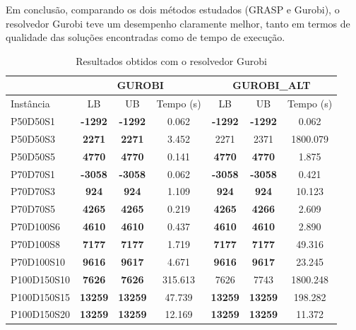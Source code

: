 \documentclass{MO824}
\begin{document}
Em conclusão, comparando os dois métodos estudados (GRASP e Gurobi), o resolvedor Gurobi teve um desempenho claramente melhor, tanto em termos de qualidade das soluções encontradas como de tempo de execução.


\begin{table}[ht]
\centering
\caption{Resultados obtidos com o resolvedor Gurobi}
\label{tab-gurobi}
\begin{tabular}{|l|c|c|c|c|c|c|}
\hline
            & \multicolumn{3}{c|}{GUROBI}                 & \multicolumn{3}{c|}{GUROBI\_ALT}                \\ \hline
Instância   & LB             & UB             & Tempo (s) & LB               & UB               & Tempo (s) \\ \hline
P50D50S1    & \textbf{-1292} & \textbf{-1292} & 0.062     & \textbf{-1292} & \textbf{-1292} & 0.062     \\ \hline
P50D50S3    & \textbf{2271}  & \textbf{2271}  & 3.452     & 2271           & 2371           & 1800.079  \\ \hline
P50D50S5    & \textbf{4770}  & \textbf{4770}  & 0.141     & \textbf{4770}  & \textbf{4770}  & 1.875     \\ \hline
P70D70S1    & \textbf{-3058} & \textbf{-3058} & 0.062     & \textbf{-3058} & \textbf{-3058} & 0.421     \\ \hline
P70D70S3    & \textbf{924}   & \textbf{924}   & 1.109     & \textbf{924}   & \textbf{924}   & 10.123    \\ \hline
P70D70S5    & \textbf{4265}  & \textbf{4265}  & 0.219     & \textbf{4265}  & \textbf{4266}  & 2.609     \\ \hline
P70D100S6   & \textbf{4610}  & \textbf{4610}  & 0.437     & \textbf{4610}  & \textbf{4610}  & 2.890     \\ \hline
P70D100S8   & \textbf{7177}  & \textbf{7177}  & 1.719     & \textbf{7177}  & \textbf{7177}  & 49.316    \\ \hline
P70D100S10  & \textbf{9616}  & \textbf{9617}  & 4.671     & \textbf{9616}  & \textbf{9617}  & 23.245    \\ \hline
P100D150S10 & \textbf{7626}  & \textbf{7626}  & 315.613   & 7626           & 7743           & 1800.248  \\ \hline
P100D150S15 & \textbf{13259} & \textbf{13259} & 47.739    & \textbf{13259} & \textbf{13259} & 198.282   \\ \hline
P100D150S20 & \textbf{13259} & \textbf{13259} & 12.169    & \textbf{13259} & \textbf{13259} & 11.372    \\ \hline
\end{tabular}
\end{table}
\end{document}
